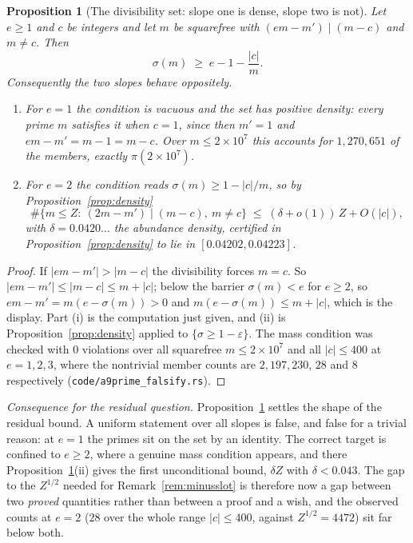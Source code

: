 \documentclass[11pt]{article}
\newtheorem{proposition}[theorem]{Proposition}
\theoremstyle{definition}
\begin{document}
\begin{proposition}[The divisibility set: slope one is dense, slope two is not]\label{prop:divset}
Let $e\ge1$ and $c$ be integers and let $m$ be squarefree with
$(em-m')\mid(m-c)$ and $m\neq c$. Then
\[ \sigma(m)\;\ge\;e-1-\frac{|c|}{m}. \]
Consequently the two slopes behave oppositely.
\begin{enumerate}[label=\textup{(\roman*)},leftmargin=2.2em]
\item For $e=1$ the condition is vacuous and the set has positive density: every prime $m$ satisfies
it when $c=1$, since then $m'=1$ and $em-m'=m-1=m-c$. Over $m\le2\times10^7$ this accounts for
$1{,}270{,}651$ of the members, exactly $\pi(2\times10^7)$.
\item For $e=2$ the condition reads $\sigma(m)\ge1-|c|/m$, so by Proposition~\ref{prop:density}
\[ \#\{m\le Z:\ (2m-m')\mid(m-c),\ m\neq c\}\;\le\;(\delta+o(1))\,Z+O(|c|), \]
with $\delta=0.0420\ldots$ the abundance density, certified in Proposition~\ref{prop:density} to lie
in $[0.04202,0.04223]$.
\end{enumerate}
\end{proposition}
\begin{proof}
If $|em-m'|>|m-c|$ the divisibility forces $m=c$. So $|em-m'|\le|m-c|\le m+|c|$; below the barrier
$\sigma(m)<e$ for $e\ge2$, so $em-m'=m(e-\sigma(m))>0$ and $m(e-\sigma(m))\le m+|c|$, which is the
display. Part (i) is the computation just given, and (ii) is Proposition~\ref{prop:density} applied
to $\{\sigma\ge1-\varepsilon\}$. The mass condition was checked with $0$ violations over all
squarefree $m\le2\times10^7$ and all $|c|\le400$ at $e=1,2,3$, where the nontrivial member counts are
$2{,}197{,}230$, $28$ and $8$ respectively (\texttt{code/a9prime\_falsify.rs}).
\end{proof}

\emph{Consequence for the residual question.} Proposition~\ref{prop:divset} settles the shape of the residual bound. A uniform statement over all
slopes is false, and false for a trivial reason: at $e=1$ the primes sit on the set by an identity.
The correct target is confined to $e\ge2$, where a genuine mass condition appears, and there
Proposition~\ref{prop:divset}(ii) gives the first unconditional bound, $\delta Z$ with
$\delta<0.043$. The gap to the $Z^{1/2}$ needed for Remark~\ref{rem:minusslot} is therefore now a
gap between two \emph{proved} quantities rather than between a proof and a wish, and the observed
counts at $e=2$ ($28$ over the whole range $|c|\le400$, against $Z^{1/2}=4472$) sit far below both.
\end{document}
